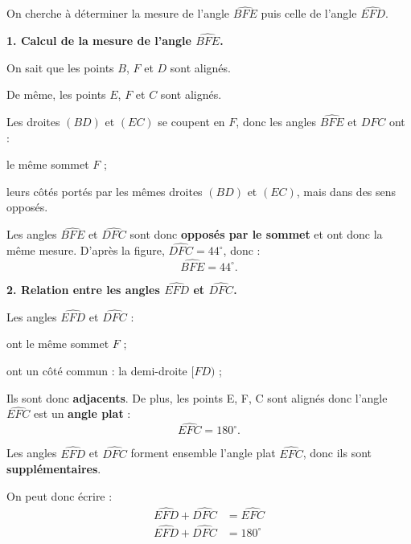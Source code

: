 \documentclass[answers]{exam}
\begin{document}
  \begin{solution}
On cherche à déterminer la mesure de l'angle $\widehat{BFE}$ puis celle de l'angle $\widehat{EFD}$.

\medskip
\textbf{1. Calcul de la mesure de l'angle $\widehat{BFE}$.}

\medskip

On sait que les points $B$, $F$ et $D$ sont alignés.

\medskip

De même, les points $E$, $F$ et $C$ sont alignés.

\medskip

Les droites $(BD)$ et $(EC)$ se coupent en $F$, donc les angles $\widehat{BFE}$ et $\widehat{DFC}$ ont :

\medskip

\begin{compactitem}
  \item le même sommet $F$ ;
  \item leurs côtés portés par les mêmes droites $(BD)$ et $(EC)$, mais dans des sens opposés.
\end{compactitem}

\medskip

Les angles $\widehat{BFE}$ et $\widehat{DFC}$ sont donc \textbf{opposés par le sommet} et ont donc la même mesure. D'après la figure, $\widehat{DFC} = 44^\circ$, donc :
\[
\widehat{BFE} = 44^\circ.
\]

\medskip
\textbf{2. Relation entre les angles $\widehat{EFD}$ et $\widehat{DFC}$.}

\medskip

Les angles $\widehat{EFD}$ et $\widehat{DFC}$ :
\begin{compactitem}
  \item ont le même sommet $F$ ;
  \item ont un côté commun : la demi-droite $[FD)$ ;
\end{compactitem}

\medskip

Ils sont donc \textbf{adjacents}. De plus, les points E, F, C sont alignés donc l’angle $\widehat{EFC}$ est un \textbf{angle plat} :
\[
\widehat{EFC} = 180^\circ.
\]

Les angles $\widehat{EFD}$ et $\widehat{DFC}$ forment ensemble l’angle plat $\widehat{EFC}$, donc ils sont \textbf{supplémentaires}.

On peut donc écrire : 
\begin{align*}
\widehat{EFD} + \widehat{DFC} &= \widehat{EFC} \\
\widehat{EFD} + \widehat{DFC} &= 180^\circ \\
\end{align*}


\end{solution}
\end{document}
